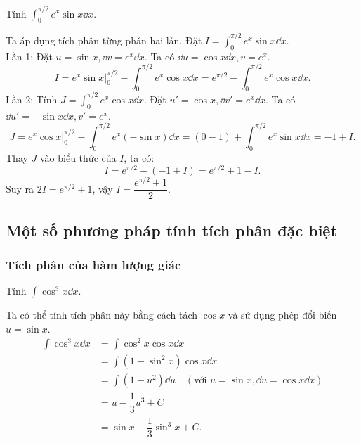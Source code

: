 \begin{example}
    Tính $\int_0^{\pi/2} e^x \sin x \dd x$.
\end{example}
\begin{solution}
    Ta áp dụng tích phân từng phần hai lần. Đặt $I = \int_0^{\pi/2} e^x \sin x \dd x$. \\
    Lần 1: Đặt $u = \sin x, \dd v = e^x \dd x$. Ta có $\dd u = \cos x \dd x, v = e^x$.
    \[
        I = e^x \sin x \bigg|_0^{\pi/2} - \int_0^{\pi/2} e^x \cos x \dd x = e^{\pi/2} - \int_0^{\pi/2} e^x \cos x \dd x.
    \]
    Lần 2: Tính $J = \int_0^{\pi/2} e^x \cos x \dd x$. Đặt $u' = \cos x, \dd v' = e^x \dd x$. Ta có $\dd u' = -\sin x \dd x, v' = e^x$.
    \[
        J = e^x \cos x \bigg|_0^{\pi/2} - \int_0^{\pi/2} e^x (-\sin x) \dd x = (0 - 1) + \int_0^{\pi/2} e^x \sin x \dd x = -1 + I.
    \]
    Thay $J$ vào biểu thức của $I$, ta có:
    \[
        I = e^{\pi/2} - (-1 + I) = e^{\pi/2} + 1 - I.
    \]
    Suy ra $2I = e^{\pi/2} + 1$, vậy $I = \dfrac{e^{\pi/2} + 1}{2}$.
\end{solution}

\subsection{Một số phương pháp tính tích phân đặc biệt}

\subsubsection{Tích phân của hàm lượng giác}

\begin{example}
    Tính $\int \cos^3 x \dd x$.
\end{example}
\begin{solution}
    Ta có thể tính tích phân này bằng cách tách $\cos x$ và sử dụng phép đổi biến $u = \sin x$.
    \begin{align*}
        \int \cos^3 x \dd x &= \int \cos^2 x \cos x \dd x \\
        &= \int (1 - \sin^2 x) \cos x \dd x \\
        &= \int (1 - u^2) \dd u \quad (\text{với } u = \sin x, \dd u = \cos x \dd x) \\
        &= u - \dfrac{1}{3}u^3 + C \\
        &= \sin x - \dfrac{1}{3}\sin^3 x + C.
    \end{align*}
\end{solution}

